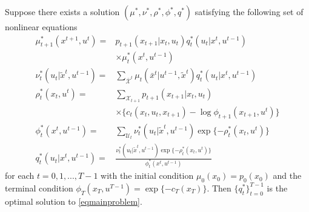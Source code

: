 \begin{theorem}
Suppose there exists a solution $(\mu^*, \nu^*, \rho^*, \phi^*, q^*)$ satisfying the following set of nonlinear equations
\begin{align*}
\mu_{t+1}^*(x^{t+1}, u^t)=&p_{t+1}(x_{t+1}|x_t, u_t)q_t^*(u_t|x^t, u^{t-1})\\
&\times \mu_t^*(x^t,u^{t-1}) \\
\nu_t^*(u_t|\tilde{x}^t, u^{t-1})=&\sum_{\bar{\mathcal{X}}^t}\mu_t(\bar{x}^t|u^{t-1}, \tilde{x}^t)q_t^*(u_t|x^t,u^{t-1}) \\
\rho_t^*(x_t, u^t)=&\sum_{\mathcal{X}_{t+1}}p_{t+1}(x_{t+1}|x_t, u_t) \\
&\times \{c_t(x_t, u_t, x_{t+1})-\log \phi_{t+1}(x_{t+1}, u^t)\} \\
\phi_t^*(x^t, u^{t-1})=&\sum_{\mathcal{U}_t} \nu_t^*(u_t|\tilde{x}^t, u^{t-1})\exp\{-\rho_t^*(x_t, u^t)\} \\
q_t^*(u_t|x^t, u^{t-1})=&\frac{\nu_t^*(u_t|\tilde{x}^t, u^{t-1})\exp\{-\rho_t^*(x_t, u^t)\}}{\phi_t^*(x^t, u^{t-1})}
\end{align*}
for each $t=0, 1, ..., T-1$ with the initial condition $\mu_0(x_0)=p_0(x_0)$ and the terminal condition $\phi_T(x_T, u^{T-1})=\exp\{-c_T(x_T)\}$. Then $\{q_t^*\}_{t=0}^{T-1}$ is the optimal solution to \eqref{eqmainproblem}.
\end{theorem}
